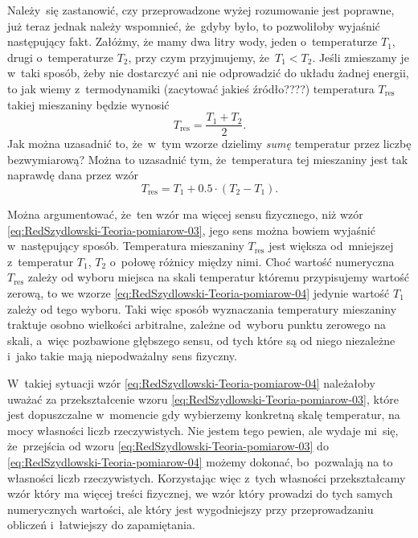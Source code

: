 \documentclass[a4paper,11pt]{article}
\begin{document}
Należy~się zastanowić, czy przeprowadzone wyżej rozumowanie jest poprawne,
już teraz jednak należy wspomnieć, że~gdyby było, to pozwoliłoby wyjaśnić
następujący fakt. Załóżmy, że mamy dwa litry wody, jeden o~temperaturze
$T_{ 1 }$, drugi o~temperaturze $T_{ 2 }$, przy czym przyjmujemy,
że~$T_{ 1 } < T_{ 2 }$. Jeśli zmieszamy je w~taki sposób, żeby nie dostarczyć
ani nie odprowadzić do układu żadnej energii, to jak wiemy z~termodynamiki
(zacytować jakieś źródło????) temperatura $T_{ \textrm{res} }$ takiej
mieszaniny będzie wynosić
\begin{equation}
  \label{eq:RedSzydlowski-Teoria-pomiarow-03}
  T_{ \textrm{res} } = \frac{ T_{ 1 } + T_{ 2 } }{ 2 }.
\end{equation}
Jak można uzasadnić to, że~w~tym wzorze dzielimy \textit{sumę} temperatur
przez liczbę bezwymiarową? Można to uzasadnić tym, że~temperatura tej
mieszaniny jest tak naprawdę dana przez wzór
\begin{equation}
  \label{eq:RedSzydlowski-Teoria-pomiarow-04}
  T_{ \textrm{res} } = T_{ 1 } + 0.5 \cdot ( T_{ 2 } - T_{ 1 } ).
\end{equation}

Można argumentować, że~ten wzór ma więcej sensu fizycznego, niż wzór
\eqref{eq:RedSzydlowski-Teoria-pomiarow-03}, jego sens można bowiem wyjaśnić
w~następujący sposób. Temperatura mieszaniny $T_{ \textrm{res} }$ jest większa
od~mniejszej z~temperatur $T_{ 1 }$, $T_{ 2 }$ o~połowę różnicy między nimi.
Choć wartość numeryczna $T_{ \textrm{res} }$ zależy od wyboru miejsca na skali
temperatur któremu przypisujemy wartość zerową, to we wzorze
\eqref{eq:RedSzydlowski-Teoria-pomiarow-04} jedynie wartość $T_{ 1 }$ zależy
od tego wyboru. Taki więc sposób wyznaczania temperatury mieszaniny traktuje
osobno wielkości arbitralne, zależne od~wyboru punktu zerowego na skali,
a~więc pozbawione głębszego sensu, od tych które są od niego
niezależne i~jako takie mają niepodważalny sens fizyczny.

W~takiej sytuacji wzór \eqref{eq:RedSzydlowski-Teoria-pomiarow-04}
należałoby uważać za przekształcenie wzoru
\eqref{eq:RedSzydlowski-Teoria-pomiarow-03}, które jest dopuszczalne
w~momencie gdy wybierzemy konkretną skalę temperatur, na mocy własności
liczb rzeczywistych. Nie jestem tego pewien, ale wydaje mi~się, że~przejścia
od wzoru \eqref{eq:RedSzydlowski-Teoria-pomiarow-03} do
\eqref{eq:RedSzydlowski-Teoria-pomiarow-04} możemy dokonać, bo~pozwalają na
to własności liczb rzeczywistych. Korzystając więc z~tych własności
przekształcamy wzór który ma więcej treści fizycznej, we wzór który prowadzi
do tych samych numerycznych wartości, ale który jest wygodniejszy przy
przeprowadzaniu obliczeń i~łatwiejszy do zapamiętania.
\end{document}
